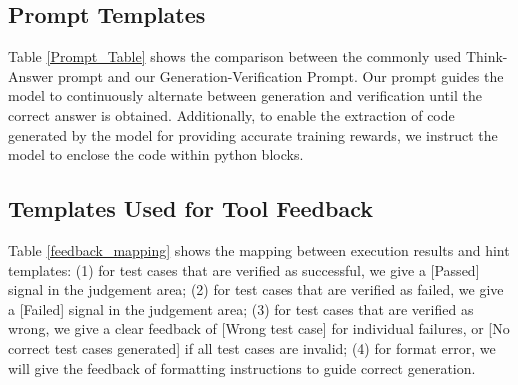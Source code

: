\documentclass{article} %
\begin{document}
\subsection{Prompt Templates} 
Table \ref{Prompt_Table} shows the comparison between the commonly used Think-Answer prompt and our Generation-Verification Prompt. Our prompt guides the model to continuously alternate between generation and verification until the correct answer is obtained. Additionally, to enable the extraction of code generated by the model for providing accurate training rewards, we instruct the model to enclose the code within python blocks.

\subsection{Templates Used for Tool Feedback}
Table \ref{feedback_mapping} shows the mapping between execution results and hint templates: (1) for test cases that are verified as successful, we give a [Passed] signal in the judgement area; (2) for test cases that are verified as failed, we give a [Failed] signal in the judgement area; (3) for test cases that are verified as wrong, we give a clear feedback of [Wrong test case] for individual failures, or [No correct test cases generated] if all test cases are invalid; (4) for format error, we will give the feedback of formatting instructions to guide correct generation.
\end{document}
